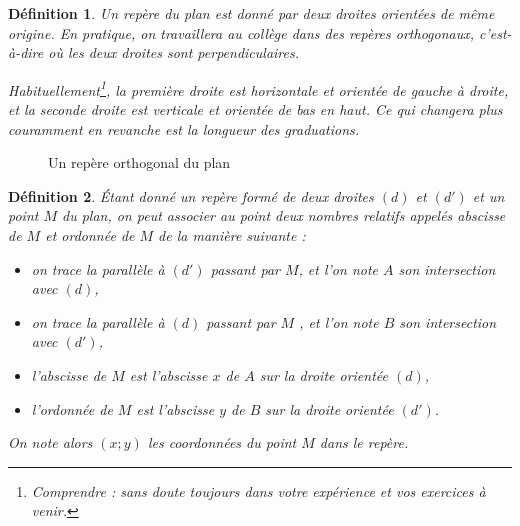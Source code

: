 \documentclass[12 pt]{article}
\theoremstyle{plain}
\newcounter{n}
\numberwithin{n}{section}
\newtheorem*{df}{Définition}
\begin{document}
\begin{df}
Un \emph{repère} du plan est donné par deux droites orientées de même origine. 
En pratique, on travaillera au collège dans des repères \emph{orthogonaux}, 
c'est-à-dire où les deux droites sont perpendiculaires. 

Habituellement\footnote{Comprendre : sans doute toujours dans votre expérience et vos exercices à venir.}, la première 
droite est horizontale et orientée de gauche à droite, et la seconde droite est verticale et orientée de bas en haut.
Ce qui changera plus couramment en revanche est la longueur des graduations. 
\end{df}
\begin{figure}[H]
\center
{}
\caption{Un repère orthogonal du plan}
\end{figure}  

\begin{df}
Étant donné un repère formé de deux droites $(d)$ et $(d')$ et un point $M$ du plan, on peut 
associer au point deux nombres relatifs appelés \emph{abscisse} de $M$ et \emph{ordonnée} de $M$ de la manière suivante : 
\begin{itemize}
\item on trace la parallèle à $(d')$ passant par $M$, et l'on note $A$ son intersection avec $(d)$, 
\item on trace la parallèle à $(d)$ passant par $M$ , et l'on note $B$ son intersection avec $(d')$, 
\item l'abscisse de $M$ est l'abscisse $x$ de $A$ sur la droite orientée $(d)$,
\item l'ordonnée de $M$ est l'abscisse $y$ de $B$ sur la droite orientée $(d')$.
\end{itemize}
On note alors $(x;y)$ les coordonnées du point $M$ dans le repère.
\end{df}
\end{document}
